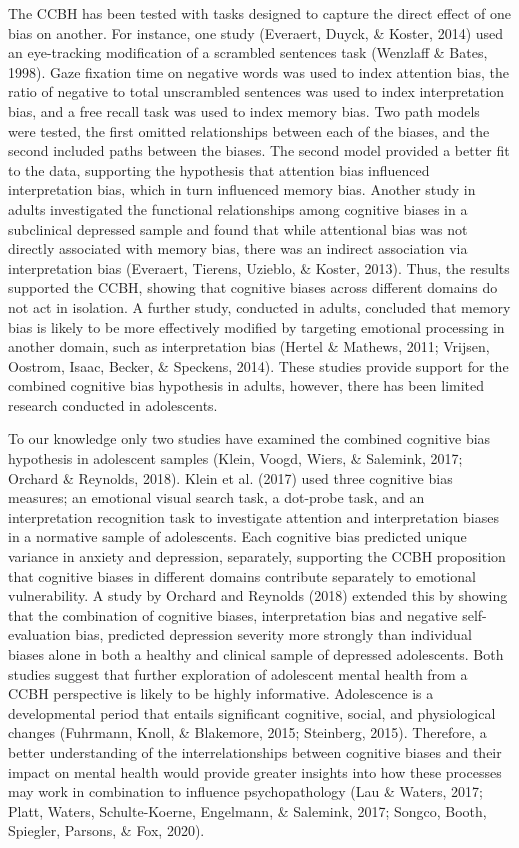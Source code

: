 \documentclass[
  english,
  man]{apa6}
\begin{document}
The CCBH has been tested with tasks designed to capture the direct effect of one bias on another. For instance, one study (Everaert, Duyck, \& Koster, 2014) used an eye-tracking modification of a scrambled sentences task (Wenzlaff \& Bates, 1998). Gaze fixation time on negative words was used to index attention bias, the ratio of negative to total unscrambled sentences was used to index interpretation bias, and a free recall task was used to index memory bias. Two path models were tested, the first omitted relationships between each of the biases, and the second included paths between the biases. The second model provided a better fit to the data, supporting the hypothesis that attention bias influenced interpretation bias, which in turn influenced memory bias. Another study in adults investigated the functional relationships among cognitive biases in a subclinical depressed sample and found that while attentional bias was not directly associated with memory bias, there was an indirect association via interpretation bias (Everaert, Tierens, Uzieblo, \& Koster, 2013). Thus, the results supported the CCBH, showing that cognitive biases across different domains do not act in isolation. A further study, conducted in adults, concluded that memory bias is likely to be more effectively modified by targeting emotional processing in another domain, such as interpretation bias (Hertel \& Mathews, 2011; Vrijsen, Oostrom, Isaac, Becker, \& Speckens, 2014). These studies provide support for the combined cognitive bias hypothesis in adults, however, there has been limited research conducted in adolescents.

To our knowledge only two studies have examined the combined cognitive bias hypothesis in adolescent samples (Klein, Voogd, Wiers, \& Salemink, 2017; Orchard \& Reynolds, 2018). Klein et al. (2017) used three cognitive bias measures; an emotional visual search task, a dot-probe task, and an interpretation recognition task to investigate attention and interpretation biases in a normative sample of adolescents. Each cognitive bias predicted unique variance in anxiety and depression, separately, supporting the CCBH proposition that cognitive biases in different domains contribute separately to emotional vulnerability. A study by Orchard and Reynolds (2018) extended this by showing that the combination of cognitive biases, interpretation bias and negative self-evaluation bias, predicted depression severity more strongly than individual biases alone in both a healthy and clinical sample of depressed adolescents. Both studies suggest that further exploration of adolescent mental health from a CCBH perspective is likely to be highly informative. Adolescence is a developmental period that entails significant cognitive, social, and physiological changes (Fuhrmann, Knoll, \& Blakemore, 2015; Steinberg, 2015). Therefore, a better understanding of the interrelationships between cognitive biases and their impact on mental health would provide greater insights into how these processes may work in combination to influence psychopathology (Lau \& Waters, 2017; Platt, Waters, Schulte-Koerne, Engelmann, \& Salemink, 2017; Songco, Booth, Spiegler, Parsons, \& Fox, 2020).
\end{document}
